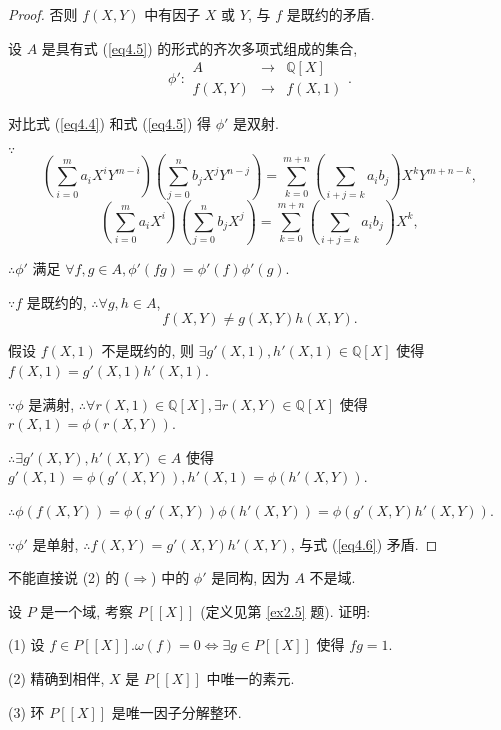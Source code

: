 \documentclass[UTF8]{ctexart}
\begin{document}
\begin{proof}
    否则 $f(X,Y)$ 中有因子 $X$ 或 $Y$, 与 $f$ 是既约的矛盾.

    设 $A$ 是具有式 (\ref{eq4.5}) 的形式的齐次多项式组成的集合,
    \[\phi':\begin{array}{rcl}
        A & \to & \mathbb{Q}[X] \\
        f(X,Y) & \to & f(X,1)
    \end{array}.\]

    对比式 (\ref{eq4.4}) 和式 (\ref{eq4.5}) 得 $\phi'$ 是双射.

    $\because$
    \[\left(\sum\limits_{i=0}^ma_iX^iY^{m-i}\right)\left(\sum\limits_{j=0}^nb_jX^jY^{n-j}\right)=\sum\limits_{k=0}^{m+n}\left(\sum\limits_{i+j=k}a_ib_j\right)X^kY^{m+n-k},\]
    \[\left(\sum\limits_{i=0}^ma_iX^i\right)\left(\sum\limits_{j=0}^nb_jX^j\right)=\sum\limits_{k=0}^{m+n}\left(\sum\limits_{i+j=k}a_ib_j\right)X^k,\]

    $\therefore\phi'$ 满足 $\forall f,g\in A,\phi'(fg)=\phi'(f)\phi'(g)$.

    $\because f$ 是既约的, $\therefore\forall g,h\in A$,
    \begin{equation}\label{eq4.6}
        f(X,Y)\neq g(X,Y)h(X,Y).
    \end{equation}
    
    假设 $f(X,1)$ 不是既约的, 则 $\exists g'(X,1),h'(X,1)\in\mathbb{Q}[X]$ 使得 $f(X,1)=g'(X,1)h'(X,1)$.

    $\because\phi$ 是满射, $\therefore\forall r(X,1)\in\mathbb{Q}[X],\exists r(X,Y)\in\mathbb{Q}[X]$ 使得 $r(X,1)=\phi(r(X,Y))$.

    $\therefore\exists g'(X,Y),h'(X,Y)\in A$ 使得 $g'(X,1)=\phi(g'(X,Y)),h'(X,1)=\phi(h'(X,Y))$.

    $\therefore\phi(f(X,Y))=\phi(g'(X,Y))\phi(h'(X,Y))=\phi(g'(X,Y)h'(X,Y))$.

    $\because\phi'$ 是单射, $\therefore f(X,Y)=g'(X,Y)h'(X,Y)$, 与式 (\ref{eq4.6}) 矛盾.
\end{proof}
\begin{note}
    不能直接说 (2) 的 ($\Rightarrow$) 中的 $\phi'$ 是同构, 因为 $A$ 不是域.
\end{note}
\begin{exercise}\label{ex3.6}
    设 $P$ 是一个域, 考察 $P[[X]]$ (定义见第 \ref{ex2.5} 题). 证明:

    (1) 设 $f\in P[[X]].\omega(f)=0\Leftrightarrow\exists g\in P[[X]]$ 使得 $fg=1$.

    (2) 精确到相伴, $X$ 是 $P[[X]]$ 中唯一的素元.

    (3) 环 $P[[X]]$ 是唯一因子分解整环.
\end{exercise}
\end{document}
